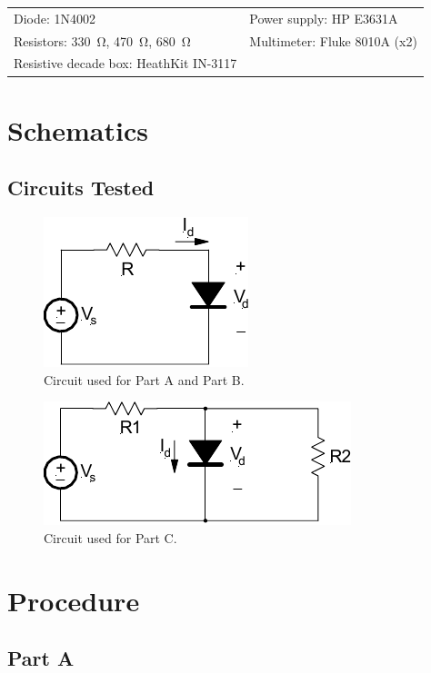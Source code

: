 \documentclass{article}
\begin{document}
\begin{tabular}{ll}
  \centering
  Diode: 1N4002 & Power supply: HP E3631A \\
  Resistors: \SI{330}{\ohm}, \SI{470}{\ohm}, \SI{680}{\ohm} & Multimeter: Fluke 8010A (x2)\\
  Resistive decade box: HeathKit IN-3117 & \\
\end{tabular}

\section{Schematics}
\label{sec:schematics}

\subsection{Circuits Tested}
\label{sec:ckt_tested}

\begin{figure}[hbtp]
  \centering
  \includegraphics[]{img/circuit1}
  \caption{\label{fig:circuit1} Circuit used for Part A and Part B.}
\end{figure}

\begin{figure}[hbtp]
  \centering
  \includegraphics[]{img/circuit2}
  \caption{\label{fig:circuit2} Circuit used for Part C.}
\end{figure}

\section{Procedure}
\label{sec:procedure}

\subsection{Part A}
\label{sec:proc_a}
\end{document}
